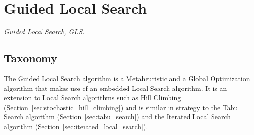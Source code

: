 

\section{Guided Local Search} 
\label{sec:guided_local_search}

\emph{Guided Local Search, GLS.}

\subsection{Taxonomy}
The Guided Local Search algorithm is a Metaheuristic and a Global Optimization algorithm that makes use of an embedded Local Search algorithm.
It is an extension to Local Search algorithms such as Hill Climbing (Section~\ref{sec:stochastic_hill_climbing}) and is similar in strategy to the Tabu Search algorithm (Section~\ref{sec:tabu_search}) and the Iterated Local Search algorithm (Section~\ref{sec:iterated_local_search}).

